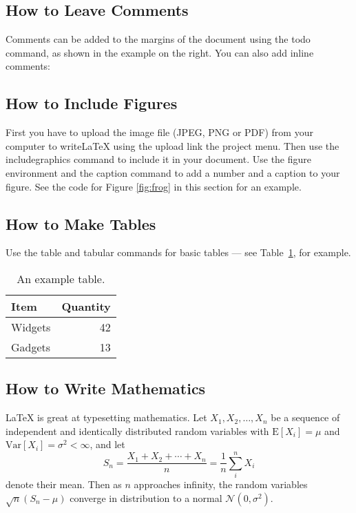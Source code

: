 \documentclass[a4paper]{article}
\begin{document}
\subsection{How to Leave Comments}

Comments can be added to the margins of the document using the  todo command, as shown in the example on the right. You can also add inline comments:


\subsection{How to Include Figures}

First you have to upload the image file (JPEG, PNG or PDF) from your computer to writeLaTeX using the upload link the project menu. Then use the includegraphics command to include it in your document. Use the figure environment and the caption command to add a number and a caption to your figure. See the code for Figure \ref{fig:frog} in this section for an example.


\subsection{How to Make Tables}

Use the table and tabular commands for basic tables --- see Table~\ref{tab:widgets}, for example.

\begin{table}
\centering
\begin{tabular}{l|r}
Item & Quantity \\\hline
Widgets & 42 \\
Gadgets & 13
\end{tabular}
\caption{\label{tab:widgets}An example table.}
\end{table}

\subsection{How to Write Mathematics}

\LaTeX{} is great at typesetting mathematics. Let $X_1, X_2, \ldots, X_n$ be a sequence of independent and identically distributed random variables with $\text{E}[X_i] = \mu$ and $\text{Var}[X_i] = \sigma^2 < \infty$, and let
$$S_n = \frac{X_1 + X_2 + \cdots + X_n}{n}
      = \frac{1}{n}\sum_{i}^{n} X_i$$
denote their mean. Then as $n$ approaches infinity, the random variables $\sqrt{n}(S_n - \mu)$ converge in distribution to a normal $\mathcal{N}(0, \sigma^2)$.
\end{document}
